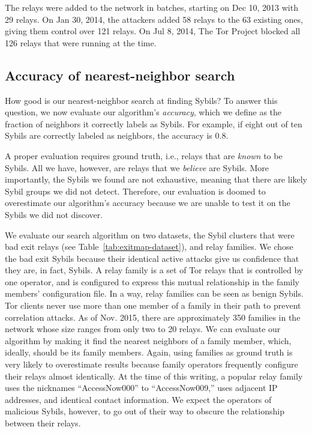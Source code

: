 The relays were added to the network in batches, starting on Dec 10, 2013 with
29 relays.  On Jan 30, 2014, the attackers added 58 relays to the 63 existing
ones, giving them control over 121 relays.  On Jul 8, 2014, The Tor Project
blocked all 126 relays that were running at the time.

% 

\subsection{Accuracy of nearest-neighbor search}
\label{sec:accuracy}
How good is our nearest-neighbor search at finding Sybils?  To answer this
question, we now evaluate our algorithm's \emph{accuracy}, which we define as
the fraction of neighbors it correctly labels as Sybils.  For example, if eight
out of ten Sybils are correctly labeled as neighbors, the accuracy is 0.8.

A proper evaluation requires ground truth, i.e., relays that are \emph{known} to
be Sybils.  All we have, however, are relays that we \emph{believe} are Sybils.
More importantly, the Sybils we found are not exhaustive, meaning that there are
likely Sybil groups we did not detect.  Therefore, our evaluation is doomed to
overestimate our algorithm's accuracy because we are unable to test it on the
Sybils we did not discover.

We evaluate our search algorithm on two datasets, the Sybil clusters that were
bad exit relays (see Table~\ref{tab:exitmap-dataset}), and relay families.  We
chose the bad exit Sybils because their identical active attacks give us
confidence that they are, in fact, Sybils.  A relay family is a set of Tor
relays that is controlled by one operator, and is configured to express this
mutual relationship in the family members' configuration file.  In a way, relay
families can be seen as benign Sybils.  Tor clients never use more than one
member of a family in their path to prevent correlation attacks.  As of Nov.
2015, there are approximately 350 families in the network whose size ranges from
only two to 20 relays.  We can evaluate our algorithm by making it find the
nearest neighbors of a family member, which, ideally, should be its family
members.  Again, using families as ground truth is very likely to overestimate
results because family operators frequently configure their relays almost
identically.  At the time of this writing, a popular relay family uses the
nicknames ``AccessNow000'' to ``AccessNow009,'' uses adjacent IP addresses, and
identical contact information.  We expect the operators of malicious Sybils,
however, to go out of their way to obscure the relationship between their
relays.

